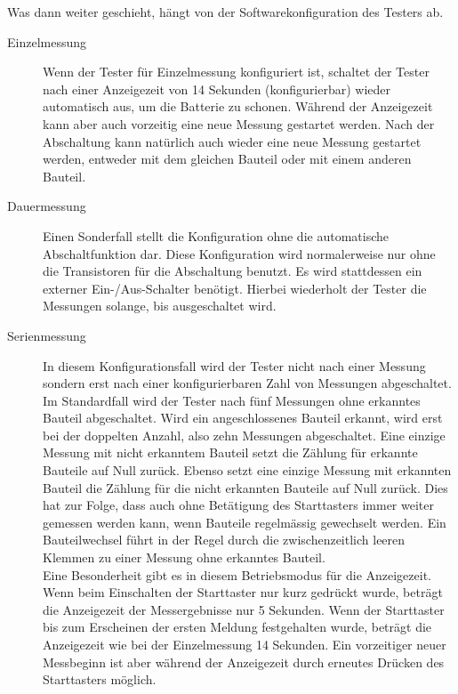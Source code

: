 Was dann weiter geschieht, hängt von der Softwarekonfiguration des Testers ab.
\begin{description}
  \item[Einzelmessung] Wenn der Tester für Einzelmessung konfiguriert ist, schaltet der Tester nach einer Anzeigezeit von 14 Sekunden
(konfigurierbar) wieder automatisch aus, um die Batterie zu schonen. Während der Anzeigezeit kann aber
auch vorzeitig eine neue Messung gestartet werden. Nach der Abschaltung kann natürlich auch wieder eine
neue Messung gestartet werden, entweder mit dem gleichen Bauteil oder mit einem anderen Bauteil.\\

  \item[Dauermessung] Einen Sonderfall stellt die Konfiguration ohne die automatische Abschaltfunktion dar.
Diese Konfiguration wird normalerweise nur ohne die Transistoren für die Abschaltung benutzt.
Es wird stattdessen ein externer Ein-/Aus-Schalter benötigt. Hierbei wiederholt der Tester die
Messungen solange, bis ausgeschaltet wird.\\

  \item[Serienmessung] In diesem Konfigurationsfall wird der Tester nicht nach einer Messung sondern erst nach einer konfigurierbaren
Zahl von Messungen abgeschaltet. Im Standardfall wird der Tester nach fünf Messungen ohne erkanntes Bauteil
abgeschaltet. Wird ein angeschlossenes Bauteil erkannt, wird erst bei der doppelten Anzahl, also zehn Messungen abgeschaltet.
Eine einzige Messung mit nicht erkanntem Bauteil setzt die Zählung für erkannte Bauteile auf Null zurück.
Ebenso setzt eine einzige Messung mit erkannten Bauteil die Zählung für die nicht erkannten Bauteile auf Null zurück.
Dies hat zur Folge, dass auch ohne Betätigung des Starttasters immer weiter gemessen werden kann,
 wenn Bauteile regelmässig gewechselt werden.
Ein Bauteilwechsel führt in der Regel durch die zwischenzeitlich leeren Klemmen zu einer Messung ohne erkanntes Bauteil.\\

Eine Besonderheit gibt es in diesem Betriebsmodus für die Anzeigezeit. Wenn beim Einschalten der Starttaster nur kurz
gedrückt wurde, beträgt die Anzeigezeit der Messergebnisse nur 5 Sekunden. Wenn der Starttaster bis zum Erscheinen der
ersten Meldung festgehalten wurde, beträgt die Anzeigezeit wie bei der Einzelmessung 14 Sekunden.
Ein vorzeitiger neuer Messbeginn ist aber während der Anzeigezeit durch erneutes Drücken des Starttasters möglich.\\

\end{description}

